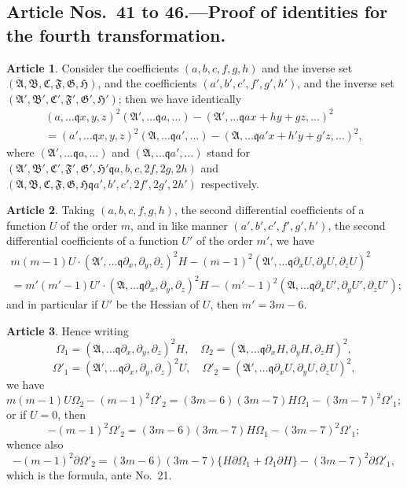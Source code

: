 \documentclass[11pt,a4paper]{article}
\theoremstyle{definition}
\newtheorem{art}{Article}[section]
\newcommand{\fA}{\mathfrak{A}}
\newcommand{\fB}{\mathfrak{B}}
\newcommand{\fC}{\mathfrak{C}}
\newcommand{\fF}{\mathfrak{F}}
\newcommand{\fG}{\mathfrak{G}}
\newcommand{\fH}{\mathfrak{H}}
\newcommand{\fApr}{\mathfrak{A}'}
\newcommand{\fBpr}{\mathfrak{B}'}
\newcommand{\fCpr}{\mathfrak{C}'}
\newcommand{\fFpr}{\mathfrak{F}'}
\newcommand{\fGpr}{\mathfrak{G}'}
\newcommand{\fHpr}{\mathfrak{H}'}
\begin{document}
\subsection*{Article Nos.\ 41 to 46.---Proof of identities for the fourth transformation.}

\setcounter{art}{40}
\begin{art}
Consider the coefficients $(a, b, c, f, g, h)$ and the inverse set
$(\fA, \fB, \fC, \fF, \fG, \fH)$, and the coefficients $(a', b', c', f', g', h')$, and the inverse set
$(\fApr, \fBpr, \fCpr, \fFpr, \fGpr, \fHpr)$; then we have identically
\begin{multline*}
(a, \dots \mathbin{\mathfrak{q}} x, y, z)^2 (\fApr, \dots \mathbin{\mathfrak{q}} a, \dots)
- (\fApr, \dots \mathbin{\mathfrak{q}} ax + hy + gz, \dots)^2 \\
= (a', \dots \mathbin{\mathfrak{q}} x, y, z)^2 (\fA, \dots \mathbin{\mathfrak{q}} a', \dots)
- (\fA, \dots \mathbin{\mathfrak{q}} a'x + h'y + g'z, \dots)^2,
\end{multline*}
where $(\fApr, \dots \mathbin{\mathfrak{q}} a, \dots)$ and $(\fA, \dots \mathbin{\mathfrak{q}} a', \dots)$ stand for
$(\fApr, \fBpr, \fCpr, \fFpr, \fGpr, \fHpr \mathbin{\mathfrak{q}} a, b, c, 2f, 2g, 2h)$ and
$(\fA, \fB, \fC, \fF, \fG, \fH \mathbin{\mathfrak{q}} a', b', c', 2f', 2g', 2h')$
respectively.
\end{art}

\setcounter{art}{41}
\begin{art}
Taking $(a, b, c, f, g, h)$, the second differential coefficients of a function $U$
of the order $m$, and in like manner $(a', b', c', f', g', h')$, the second differential coefficients
of a function $U'$ of the order $m'$, we have
\begin{multline*}
m(m-1)U \cdot (\fApr, \dots \mathbin{\mathfrak{q}} \partial_x, \partial_y, \partial_z)^2 H
- (m-1)^2 (\fApr, \dots \mathbin{\mathfrak{q}} \partial_x U, \partial_y U, \partial_z U)^2 \\
= m'(m'-1)U' \cdot (\fA, \dots \mathbin{\mathfrak{q}} \partial_x, \partial_y, \partial_z)^2 H
- (m'-1)^2 (\fA, \dots \mathbin{\mathfrak{q}} \partial_x U', \partial_y U', \partial_z U');
\end{multline*}
and in particular if $U'$ be the Hessian of $U$, then $m' = 3m - 6$.
\end{art}

\setcounter{art}{42}
\begin{art}
Hence writing
\[
\Omega_1 = (\fA, \dots \mathbin{\mathfrak{q}} \partial_x, \partial_y, \partial_z)^2 H, \quad
\Omega_2 = (\fA, \dots \mathbin{\mathfrak{q}} \partial_x H, \partial_y H, \partial_z H)^2,
\]
\[
\Omega'_1 = (\fApr, \dots \mathbin{\mathfrak{q}} \partial_x, \partial_y, \partial_z)^2 U, \quad
\Omega'_2 = (\fApr, \dots \mathbin{\mathfrak{q}} \partial_x U, \partial_y U, \partial_z U)^2,
\]
we have
\[
m(m-1)U \Omega_2 - (m-1)^2 \Omega'_2 = (3m-6)(3m-7)H \Omega_1 - (3m-7)^2 \Omega'_1;
\]
or if $U = 0$, then
\[
-(m-1)^2 \Omega'_2 = (3m-6)(3m-7)H \Omega_1 - (3m-7)^2 \Omega'_1;
\]
whence also
\[
-(m-1)^2 \partial \Omega'_2 = (3m-6)(3m-7)\{H \partial \Omega_1 + \Omega_1 \partial H\}
- (3m-7)^2 \partial \Omega'_1,
\]
which is the formula, ante No.\ 21.
\end{art}
\end{document}
